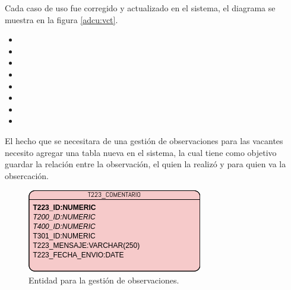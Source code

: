 \begin{itemize}
    Cada caso de uso fue corregido y actualizado en el sistema, el diagrama se muestra en la figura \ref{adcu:vct}.
    \begin{itemize}
        \item {}
        \item {}
        \item {}
        \item {}
        \item {} 
        \item {} 
        \item {}
        \item {}
    \end{itemize} 

    El hecho que se necesitara de una gestión de observaciones para las vacantes necesito agregar una tabla nueva en el sistema, la cual tiene como objetivo guardar la relación entre la observación, el quien la realizó y para quien va la obsercación.
    \begin{figure}[H]
        \begin{center}
            \includegraphics[width=.4\textwidth]{desarrollo/imagenes/nueva.png}
        \end{center}
        \caption{Entidad para la gestión de observaciones.}
        \label{mark:top}
    \end{figure}

\end{itemize} 

